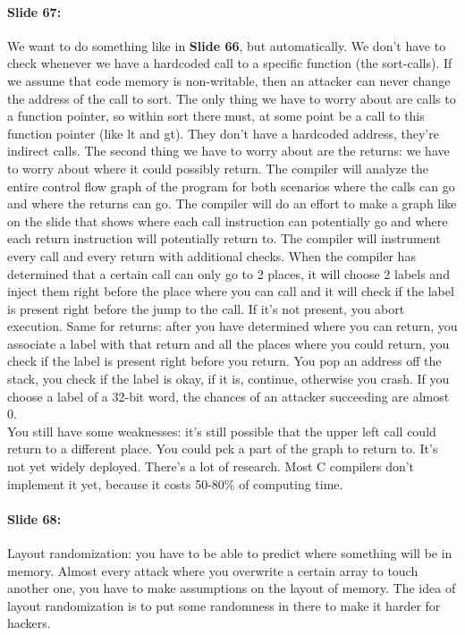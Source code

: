 \documentclass[10pt,a4paper]{report}
\begin{document}
\paragraph{Slide 67:} We want to do something like in \textbf{Slide 66}, but automatically. We don't have to check whenever we have a hardcoded call to a specific function (the sort-calls). If we assume that code memory is non-writable, then an attacker can never change the address of the call to sort. The only thing we have to worry about are calls to a function pointer, so within sort there must, at some point be a call to this function pointer (like lt and gt). They don’t have a hardcoded address, they're indirect calls. The second thing we have to worry about are the returns: we have to worry about where it could possibly return. The compiler will analyze the entire control flow graph of the program for both scenarios where the calls can go and where the returns can go. The compiler will do an effort to make a graph like on the slide that shows where each call instruction can potentially go and where each return instruction will potentially return to. The compiler will instrument every call and every return with additional checks. When the compiler has determined that a certain call can only go to 2 places, it will choose 2 labels and inject them right before the place where you can call and it will check if the label is present right before the jump to the call. If it's not present, you abort execution. Same for returns: after you have determined where you can return, you associate a label with that return and all the places where you could return, you check if the label is present right before you return. You pop an address off the stack, you check if the label is okay, if it is, continue, otherwise you crash. If you choose a label of a 32-bit word, the chances of an attacker succeeding are almost 0.\\
You still have some weaknesses: it's still possible that the upper left call could return to a different place. You could pck a part of the graph to return to. It's not yet widely deployed. There's a lot of research. Most C compilers don't implement it yet, because it costs 50-80\% of computing time.

\paragraph{Slide 68:} Layout randomization: you have to be able to predict where something will be in memory. Almost every attack where you overwrite a certain array to touch another one, you have to make assumptions on the layout of memory. The idea of layout randomization is to put some randomness in there to make it harder for hackers.
\end{document}

